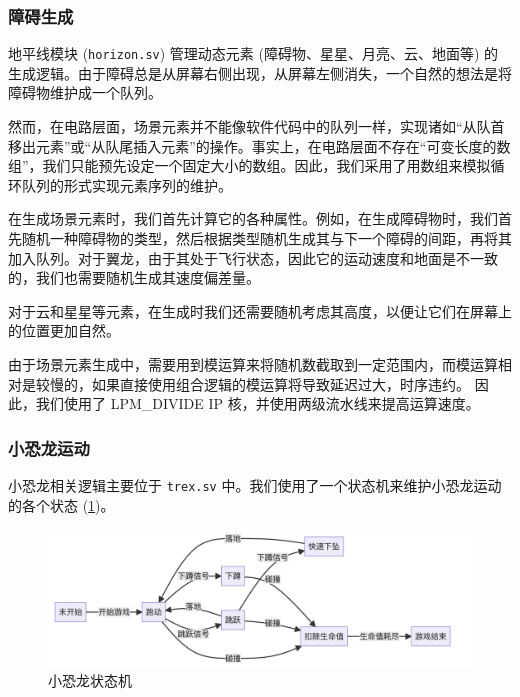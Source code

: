 \documentclass[UTF8, 11pt, fontset=none]{ctexart}
\begin{document}
\subsubsection{障碍生成}

地平线模块 (\texttt{horizon.sv}) 管理动态元素 (障碍物、星星、月亮、云、地面等) 的生成逻辑。由于障碍总是从屏幕右侧出现，从屏幕左侧消失，一个自然的想法是将障碍物维护成一个队列。

然而，在电路层面，场景元素并不能像软件代码中的队列一样，实现诸如“从队首移出元素”或“从队尾插入元素”的操作。事实上，在电路层面不存在“可变长度的数组”，我们只能预先设定一个固定大小的数组。因此，我们采用了用数组来模拟循环队列的形式实现元素序列的维护。

在生成场景元素时，我们首先计算它的各种属性。例如，在生成障碍物时，我们首先随机一种障碍物的类型，然后根据类型随机生成其与下一个障碍的间距，再将其加入队列。对于翼龙，由于其处于飞行状态，因此它的运动速度和地面是不一致的，我们也需要随机生成其速度偏差量。

对于云和星星等元素，在生成时我们还需要随机考虑其高度，以便让它们在屏幕上的位置更加自然。

由于场景元素生成中，需要用到模运算来将随机数截取到一定范围内，而模运算相对是较慢的，如果直接使用组合逻辑的模运算将导致延迟过大，时序违约。
因此，我们使用了 LPM_DIVIDE IP 核，并使用两级流水线来提高运算速度。

\subsubsection{小恐龙运动}

小恐龙相关逻辑主要位于 \texttt{trex.sv} 中。我们使用了一个状态机来维护小恐龙运动的各个状态 (\cref{dino-states})。

\begin{figure}[H]
    \centering
    \includegraphics[width=\textwidth]{images/dino-states.jpg}
    \vspace{-16pt}
    \caption{小恐龙状态机}
    \label{dino-states}
\end{figure}
\end{document}
